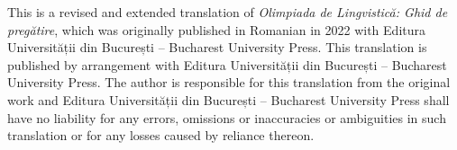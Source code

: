 
This is a revised and extended translation of \textit{Olimpiada de Lingvistică: Ghid de pregătire}, which was originally published in Romanian in 2022 with Editura Universității din București – Bucharest University Press. This translation is published by arrangement with Editura Universității din București – Bucharest University Press. The author is responsible for this translation from the original work and Editura Universității din București – Bucharest University Press shall have no liability for any errors, omissions or inaccuracies or ambiguities in such translation or for any losses caused by reliance thereon.
